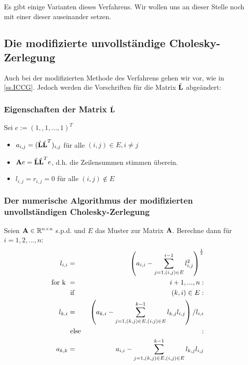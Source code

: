 Es gibt einige Varianten dieses Verfahrens. Wir wollen uns an dieser Stelle noch mit einer dieser auseinander setzen.

\subsection{Die modifizierte unvollständige Cholesky-Zerlegung}\label{ss.Modifizierte Cholesky}

Auch bei der modifizierten Methode des Verfahrens gehen wir vor, wie in \autoref{ss.ICCG}. Jedoch werden die Vorschriften für die Matrix $\tilde{{\textbf{L}}}$ abgeändert:

\subsubsection{Eigenschaften der Matrix $\tilde{{\textbf{L}}}$}\label{sss.Eigenschaften L MCZ}

Sei $e := (1,,1,...,1)^{T}$

\begin{itemize}
\item $a_{i,j} = (\tilde{{\textbf{L}}} \tilde{{\textbf{L}}}^{T})_{i,j}$ für alle $(i,j) \in E, i \ne j$
\item ${\textbf{A}} e = \tilde{{\textbf{L}}} \tilde{{\textbf{L}}}^{T} e$, d.h. die Zeilensummen stimmen überein.
\item $l_{i,j} = r_{i,j} = 0$ für alle $(i,j) \notin E$
\end{itemize}

\subsubsection{Der numerische Algorithmus der modifizierten unvollständigen Cholesky-Zerlegung}\label{sss.Algorithmus MUCZ}

Seien ${\textbf{A}} \in \mathbb{R}^{n \times n}$ s.p.d. und $E$ das Muster zur Matrix ${\textbf{A}}$. Berechne dann für $i=1,2,...,n$:
\begin{eqnarray}
l_{i,i} &=& \left( a_{i,i} - \sum^{i-1}_{j=1,(i,j) \in E} l_{i,j}^{2} \right)^{\frac {1} {2}} \\
\textnormal{for k } &=& i+1,...,n: \\
&\textnormal{ if }& (k,i) \in E: \\
l_{k,i} &=& \left( a_{k,i} - \sum^{k-1}_{j=1,(k,j) \in E, (i,j) \in E} l_{k,j} l_{i,j} \right) / l_{i,i} \\
&\textnormal{ else }&:\\
a_{k,k} &=& a_{i,i} - \sum^{k-1}_{j=1,(k,j) \in E, (i,j) \in E} l_{k,j} l_{i,j}
\end{eqnarray}


